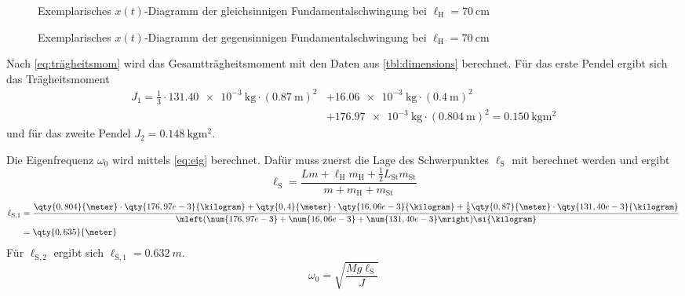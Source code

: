 \documentclass[
12pt,
a4paper,
bibliography=totocnumbered, %
BCOR=1cm, %
oneside, %
]{scrartcl}
\newcommand{\lh}{\ell_{\mathrm{H}}}
\newcommand{\ls}{\ell_{\mathrm{S}}}
\begin{document}
\begin{figure}[H]
	\caption{Exemplarisches \(x(t)\)-Diagramm der gleichsinnigen Fundamentalschwingung bei \(\lh = \qty{70}{\centi\meter}\)}
	\label{fig:gl70}
\end{figure}

\begin{figure}[H]
	\caption{Exemplarisches \(x(t)\)-Diagramm der gegensinnigen Fundamentalschwingung bei \(\lh = \qty{70}{\centi\meter}\)}
	\label{fig:geg70}
\end{figure}

%
%
%

Nach \autoref{eq:trägheitsmom} wird das Gesamtträgheitsmoment mit den Daten aus \autoref{tbl:dimensions} berechnet. Für das erste Pendel ergibt sich das Trägheitsmoment
\begin{equation}
	\begin{split}
		J_1 = \frac{1}{3} \cdot \qty{131,40e-3}{\kilogram} \cdot (\qty{0,87}{\meter})^2 &+ \qty{16,06e-3}{\kilogram} \cdot (\qty{0,4}{\meter})^2
		\\&+ \qty{176,97e-3}{\kilogram} \cdot (\qty{0,804}{\meter})^2 = \qty{0,150}{\kilogram\meter\squared}
	\end{split}
\end{equation}
und für das zweite Pendel \(J_2 = \qty{0,148}{\kilogram\meter\squared}\).

Die Eigenfrequenz \(\omega_0\) wird mittels \autoref{eq:eig} %
berechnet. Dafür muss zuerst die Lage des Schwerpunktes \(\ls\) mit %
berechnet werden und ergibt
\begin{equation}
	\ls = \frac{Lm + \lh m_{\text{H}} + \tfrac{1}{2} L_{\text{St}} m_{\text{St}}}{m + m_{\text{H}} + m_{\text{St}}}
\end{equation}
\begin{equation}
	\begin{split}
		\ell_{\text{S},1} &= \frac{\qty{0,804}{\meter} \cdot \qty{176,97e-3}{\kilogram} + \qty{0,4}{\meter} \cdot \qty{16,06e-3}{\kilogram} + \tfrac{1}{2}\qty{0,87}{\meter} \cdot \qty{131,40e-3}{\kilogram}}{\mleft(\num{176,97e-3} + \num{16,06e-3} + \num{131,40e-3}\mright)\si{\kilogram}}\\
		&= \qty{0,635}{\meter}
	\end{split}
\end{equation}
Für \(\ell_{\text{S},2}\) ergibt sich \(\ell_{\text{S},1} = \qty{0,632}{m}\).
\begin{equation}
	\omega_0 = \sqrt{\frac{Mg \ls}{J}}
\end{equation}
\end{document}
